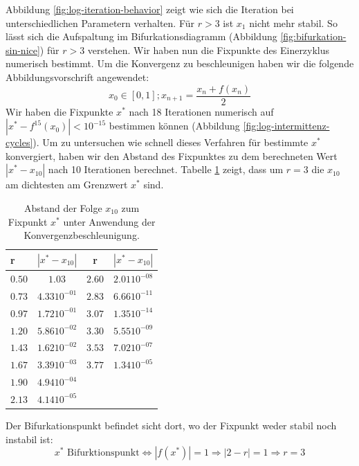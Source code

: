 \documentclass[12pt,a4paper]{article}
\begin{document}
Abbildung \ref{fig:log-iteration-behavior} zeigt wie sich die Iteration bei unterschiedlichen Parametern verhalten. Für $r>3$ ist $x_1$ nicht mehr stabil. So lässt sich die Aufspaltung im Bifurkationsdiagramm (Abbildung \ref{fig:bifurkation-sin-nice}) für $r>3$ verstehen.
Wir haben nun die Fixpunkte des Einerzyklus numerisch bestimmt. Um die Konvergenz zu beschleunigen haben wir die folgende Abbildungsvorschrift angewendet:
\begin{equation}
x_0 \in [0,1]; x_{n+1} = \frac{x_n+f(x_n)}{2}
\end{equation}
Wir haben die Fixpunkte $x^*$ nach 18 Iterationen numerisch auf $|x^*-f^{15}(x_0)|<10^{-15}$ bestimmen können (Abbildung \ref{fig:log-intermittenz-cycles}). Um zu untersuchen wie schnell dieses Verfahren für bestimmte $x^*$ konvergiert, haben wir den Abstand des Fixpunktes zu dem berechneten Wert $|x^*-x_{10}|$ nach 10 Iterationen berechnet. Tabelle \ref{tab:bla} zeigt, dass um $r=3$ die $x_{10}$ am dichtesten am Grenzwert $x^*$ sind.
\begin{table}[!htbp]
\begin{center}
  \begin{tabular}{ | l | c || c | c | }
    \hline
    r  & $|x^*-x_{10}|$ & r  & $|x^*-x_{10}|$ \\ \hline
    $0.50$ & $1.03$ & $2.60$ & $2.01 10^{-08}$ \\ \hline
    $0.73$ & $4.33 10^{-01}$ & $2.83$ & $6.66 10^{-11}$ \\ \hline
    $0.97$ & $1.72 10^{-01}$ & $3.07$ & $1.35 10^{-14}$ \\ \hline
    $1.20$ & $5.86 10^{-02}$ & $3.30$ & $5.55 10^{-09}$ \\ \hline
    $1.43$ & $1.62 10^{-02}$ & $3.53$ & $7.02 10^{-07}$ \\ \hline
    $1.67$ & $3.39 10^{-03}$ & $3.77$ & $1.34 10^{-05}$ \\ \hline
    $1.90$ & $4.94 10^{-04}$ & &  \\ \hline
    $2.13$ & $4.14 10^{-05}$ & &  \\ \hline
  \end{tabular}
  \caption{Abstand der Folge $x_{10}$ zum Fixpunkt $x^*$ unter Anwendung der Konvergenzbeschleunigung.}
  \label{tab:bla}
 \end{center}
\end{table}
Der Bifurkationspunkt befindet sicht dort, wo der Fixpunkt weder stabil noch instabil ist:
\begin{equation}
x^* \text{ Bifurktionspunkt} \iff |f(x^*)| = 1 \Rightarrow |2-r|=1 \Rightarrow r=3
\end{equation}
\end{document}
